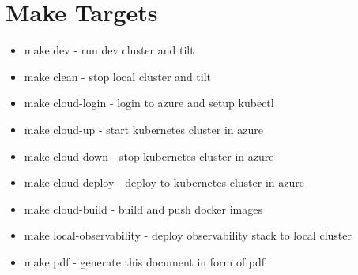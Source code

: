 \chapter{Make Targets}
\label{sec:app_05}

\begin{itemize}
    \item make dev - run dev cluster and tilt
	\item make clean - stop local cluster and tilt
	\item make cloud-login - login to azure and setup kubectl
	\item make cloud-up - start kubernetes cluster in azure
	\item make cloud-down - stop kubernetes cluster in azure
	\item make cloud-deploy - deploy to kubernetes cluster in azure
	\item make cloud-build - build and push docker images
	\item make local-observability - deploy observability stack to local cluster
	\item make pdf - generate this document in form of pdf
\end{itemize}